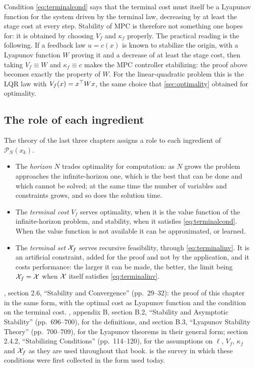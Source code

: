 Condition \eqref{eq:terminalcond} says that the terminal cost must itself be a Lyapunov
function for the system driven by the terminal law, decreasing by at least the stage cost at
every step. Stability of MPC is therefore not something one hopes for: it is obtained by
choosing $V_f$ and $\kappa_f$ properly. The practical reading is the following. If a feedback
law $u = c(x)$ is known to stabilize the origin, with a Lyapunov function $W$ proving it and a
decrease of at least the stage cost, then taking $V_f \equiv W$ and $\kappa_f \equiv c$ makes
the MPC controller stabilizing: the proof above becomes exactly the property of $W$. For the
linear-quadratic problem this is the LQR law with $V_f(x) = x^{\top} W x$, the same choice that
\cref{sec:optimality} obtained for optimality.

\subsection{The role of each ingredient}

The theory of the last three chapters assigns a role to each ingredient of $\mathcal{P}_N(x_k)$.
\begin{itemize}
  \item The \emph{horizon} $N$ trades optimality for computation: as $N$ grows the problem
        approaches the infinite-horizon one, which is the best that can be done and which cannot
        be solved; at the same time the number of variables and constraints grows, and so does
        the solution time.
  \item The \emph{terminal cost} $V_f$ serves optimality, when it is the value function of the
        infinite-horizon problem, and stability, when it satisfies \eqref{eq:terminalcond}. When
        the value function is not available it can be approximated, or learned.
  \item The \emph{terminal set} $\mathcal{X}_f$ serves recursive feasibility, through
        \eqref{eq:terminalinv}. It is an artificial constraint, added for the proof and not by
        the application, and it costs performance: the larger it can be made, the better, the
        limit being $\mathcal{X}_f = \mathcal{X}$ when $\mathcal{X}$ itself satisfies \eqref{eq:terminalinv}.
\end{itemize}

\begin{reading}
, section 2.6, ``Stability and Convergence'' (pp.~29--32): the proof of this
chapter in the same form, with the optimal cost as Lyapunov function and the condition on the
terminal cost. , appendix B, section B.2, ``Stability and Asymptotic
Stability'' (pp.~696--700), for the definitions, and section B.3, ``Lyapunov Stability
Theory'' (pp.~700--709), for the Lyapunov theorems in their general form; section 2.4.2,
``Stabilizing Conditions'' (pp.~114--120), for the assumptions on $\ell$, $V_f$, $\kappa_f$ and
$\mathcal{X}_f$ as they are used throughout that book.  is the survey in which these
conditions were first collected in the form used today.
\end{reading}
